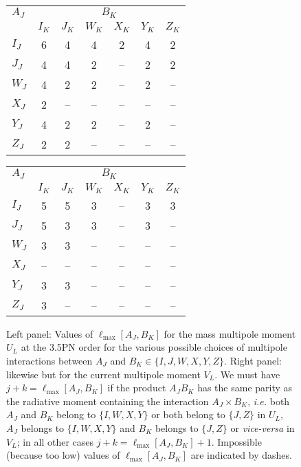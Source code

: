 \documentclass[prd,preprint,superscriptaddress,tightenlines,nofootinbib,
  eqsecnum,showpacs]{revtex4}
\begin{document}
\begin{figure}[t]
\begin{center}
\begin{tabular}{|l||c|c|c|c|c|c|} 
\hline
$A_J$ & \multicolumn{6}{c|}{$B_K$} \\ \cline{2-7} %
      &$I_K$&$J_K$&$W_K$&$X_K$&$Y_K$&$Z_K$ \\ \hline 
$I_J$ &  6  &  4  &  4  &  2 &  4  &  2  \\ \hline
$J_J$ &  4  &  4  &  2  & -- &  2  &  2  \\ \hline
$W_J$ &  4  &  2  &  2  & -- &  2  & --  \\ \hline
$X_J$ &  2  & --  &  -- & -- & --  & --  \\ \hline
$Y_J$ &  4  &  2  &  2  & -- &  2  & --  \\ \hline
$Z_J$ &  2  &  2  &  -- & -- & --  & --  \\ \hline
\end{tabular}
\hspace{2cm}
\begin{tabular}{|l||c|c|c|c|c|c|} 
\hline
$A_J$ & \multicolumn{6}{c|}{$B_K$} \\ \cline{2-7} %
      &$I_K$&$J_K$&$W_K$&$X_K$&$Y_K$&$Z_K$ \\ \hline 
$I_J$ &  5  &  5  &  3  &  -- &  3  &  3  \\ \hline
$J_J$ &  5  &  3  &  3  & -- &  3  &  --  \\ \hline
$W_J$ &  3  &  3  &  --  & -- &  --  & --  \\ \hline
$X_J$ &  --  &  --  &  -- & -- & --  & --  \\ \hline
$Y_J$ &  3  &  3  &  --  & -- &  --  & --  \\ \hline
$Z_J$ &  3  &  --  &  -- & -- & --  & --  \\ \hline
\end{tabular}		
\caption{Left panel: Values of $\ell_\text{max}[A_J,B_K]$ for the mass
  multipole moment $U_L$ at the 3.5PN order for the various possible
  choices of multipole interactions between $A_J$ and $B_K \in \{I, J,
  W, X, Y, Z\}$. Right panel: likewise but for the current multipole
  moment $V_L$. We must have $j+k=\ell_\text{max}[A_J, B_K]$ if the
  product $A_J B_K$ has the same parity as the radiative moment
  containing the interaction $A_J\times B_K$, \textit{i.e.} both $A_J$
  and $B_K$ belong to $\{I, W, X, Y\}$ or both belong to $\{J, Z\}$ in
  $U_L$, $A_J$ belongs to $\{I, W, X, Y\}$ and $B_K$ belongs to $\{J,
  Z\}$ or \textit{vice-versa} in $V_L$; in all other cases
  $j+k=\ell_\text{max}[A_J, B_K]+1$. Impossible (because too low)
  values of $\ell_\text{max}[A_J,B_K]$ are indicated by
  dashes.}\label{tab:rules}
\end{center}
\end{figure}
%
\end{document}
